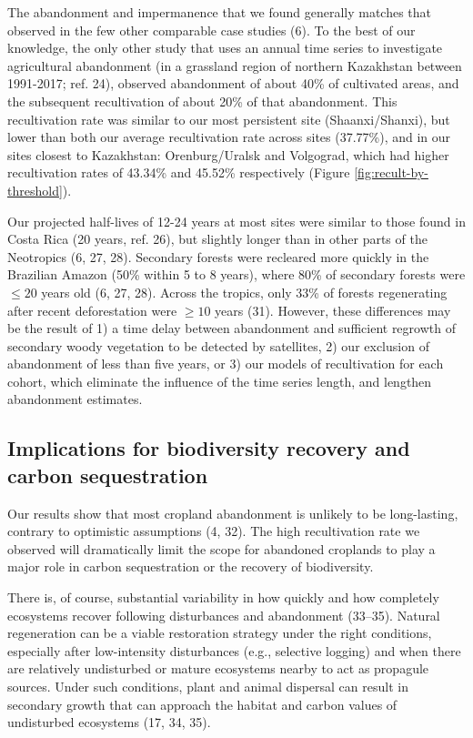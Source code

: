 \documentclass[9pt,twocolumn,twoside,lineno]{pnas-new}
\begin{document}
The abandonment and impermanence that we found generally matches that observed in the few other comparable case studies (6).
To the best of our knowledge, the only other study that uses an annual time series to investigate agricultural abandonment (in a grassland region of northern Kazakhstan between 1991-2017; ref. 24), observed abandonment of about 40\% of cultivated areas, and the subsequent recultivation of about 20\% of that abandonment.
This recultivation rate was similar to our most persistent site (Shaanxi/Shanxi), but lower than both our average recultivation rate across sites (37.77\%), and in our sites closest to Kazakhstan: Orenburg/Uralsk and Volgograd, which had higher recultivation rates of 43.34\% and 45.52\% respectively (Figure \ref{fig:recult-by-threshold}).

Our projected half-lives of 12-24 years at most sites were similar to those found in Costa Rica (20 years, ref. 26), but slightly longer than in other parts of the Neotropics (6, 27, 28).
Secondary forests were recleared more quickly in the Brazilian Amazon (50\% within 5 to 8 years), where 80\% of secondary forests were \(\leq20\) years old (6, 27, 28).
Across the tropics, only 33\% of forests regenerating after recent deforestation were \(\geq10\) years (31).
However, these differences may be the result of 1) a time delay between abandonment and sufficient regrowth of secondary woody vegetation to be detected by satellites, 2) our exclusion of abandonment of less than five years, or 3) our models of recultivation for each cohort, which eliminate the influence of the time series length, and lengthen abandonment estimates.

\hypertarget{implications-for-biodiversity-recovery-and-carbon-sequestration}{%
\subsection*{Implications for biodiversity recovery and carbon sequestration}\label{implications-for-biodiversity-recovery-and-carbon-sequestration}}

Our results show that most cropland abandonment is unlikely to be long-lasting, contrary to optimistic assumptions (4, 32).
The high recultivation rate we observed will dramatically limit the scope for abandoned croplands to play a major role in carbon sequestration or the recovery of biodiversity.

There is, of course, substantial variability in how quickly and how completely ecosystems recover following disturbances and abandonment (33--35).
Natural regeneration can be a viable restoration strategy under the right conditions, especially after low-intensity disturbances (e.g., selective logging) and when there are relatively undisturbed or mature ecosystems nearby to act as propagule sources.
Under such conditions, plant and animal dispersal can result in secondary growth that can approach the habitat and carbon values of undisturbed ecosystems (17, 34, 35).
\end{document}
